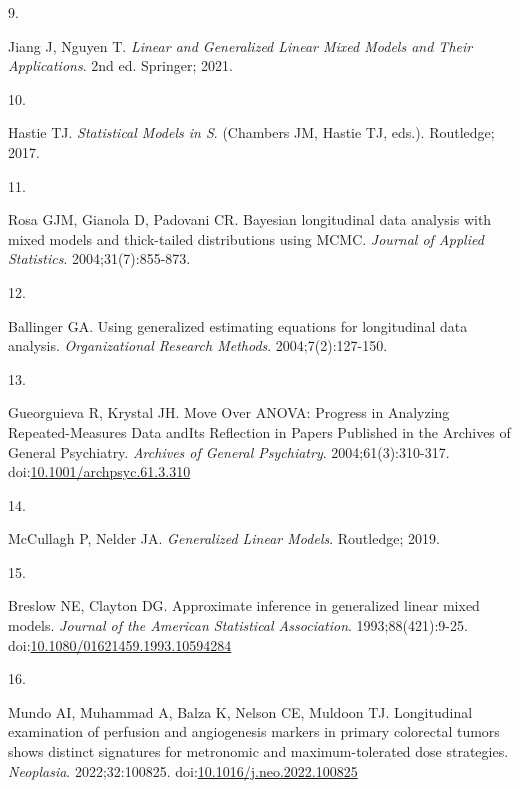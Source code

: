 \documentclass[
]{article}
\newlength{\cslhangindent}
\newlength{\csllabelwidth}
\newlength{\cslentryspacingunit} %
\newenvironment{CSLReferences}[2] %
 {%
  \setlength{\parindent}{0pt}
  \ifodd #1
  \let\oldpar\par
  \def\par{\hangindent=\cslhangindent\oldpar}
  \fi
  \setlength{\parskip}{#2\cslentryspacingunit}
 }%
 {}
\newcommand{\CSLLeftMargin}[1]{\parbox[t]{\csllabelwidth}{#1}}
\newcommand{\CSLRightInline}[1]{\parbox[t]{\linewidth - \csllabelwidth}{#1}\break}
\begin{document}
\begin{CSLReferences}{0}{0}
\leavevmode{}%
\CSLLeftMargin{9. }%
\CSLRightInline{Jiang J, Nguyen T. \emph{Linear and Generalized Linear
Mixed Models and Their Applications}. 2nd ed. Springer; 2021.}

\leavevmode{}%
\CSLLeftMargin{10. }%
\CSLRightInline{Hastie TJ. \emph{Statistical Models in {S}}. (Chambers
JM, Hastie TJ, eds.). Routledge; 2017.}

\leavevmode{}%
\CSLLeftMargin{11. }%
\CSLRightInline{Rosa GJM, Gianola D, Padovani CR. Bayesian longitudinal
data analysis with mixed models and thick-tailed distributions using
{MCMC}. \emph{Journal of Applied Statistics}. 2004;31(7):855-873.}

\leavevmode{}%
\CSLLeftMargin{12. }%
\CSLRightInline{Ballinger GA. Using generalized estimating equations for
longitudinal data analysis. \emph{Organizational Research Methods}.
2004;7(2):127-150.}

\leavevmode{}%
\CSLLeftMargin{13. }%
\CSLRightInline{Gueorguieva R, Krystal JH. {Move Over ANOVA: Progress in
Analyzing Repeated-Measures Data andIts Reflection in Papers Published
in the Archives of General Psychiatry}. \emph{Archives of General
Psychiatry}. 2004;61(3):310-317.
doi:\href{https://doi.org/10.1001/archpsyc.61.3.310}{10.1001/archpsyc.61.3.310}}

\leavevmode{}%
\CSLLeftMargin{14. }%
\CSLRightInline{McCullagh P, Nelder JA. \emph{Generalized Linear
Models}. Routledge; 2019.}

\leavevmode{}%
\CSLLeftMargin{15. }%
\CSLRightInline{Breslow NE, Clayton DG. Approximate inference in
generalized linear mixed models. \emph{Journal of the American
Statistical Association}. 1993;88(421):9-25.
doi:\href{https://doi.org/10.1080/01621459.1993.10594284}{10.1080/01621459.1993.10594284}}

\leavevmode{}%
\CSLLeftMargin{16. }%
\CSLRightInline{Mundo AI, Muhammad A, Balza K, Nelson CE, Muldoon TJ.
Longitudinal examination of perfusion and angiogenesis markers in
primary colorectal tumors shows distinct signatures for metronomic and
maximum-tolerated dose strategies. \emph{Neoplasia}. 2022;32:100825.
doi:\href{https://doi.org/10.1016/j.neo.2022.100825}{10.1016/j.neo.2022.100825}}


\end{CSLReferences}
\end{document}

